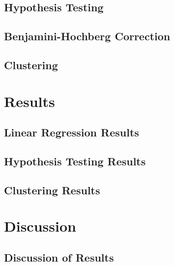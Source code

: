 \documentclass[11pt]{article}
\begin{document}
	\subsection{Hypothesis Testing}
	
		

	\subsection{Benjamini-Hochberg Correction}
	
		

	\subsection{Clustering}
	
		
		
\section{Results} \label{results}
		
	\subsection{Linear Regression Results}
	
		
				
	\subsection{Hypothesis Testing Results}
	
		
		
	\subsection{Clustering Results}
	
		

\section{Discussion} \label{discussion}
	
	\subsection{Discussion of Results}
		
\end{document}
